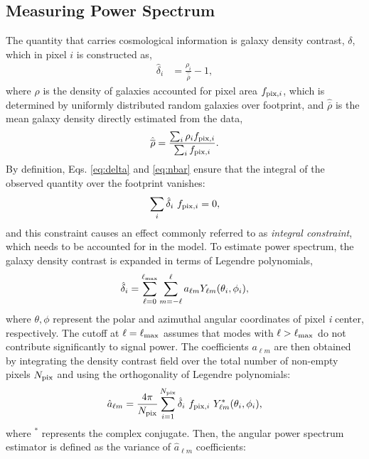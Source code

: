 \subsection{Measuring Power Spectrum}
The quantity that carries cosmological information is galaxy density contrast, $\delta$, which in pixel $i$ is constructed as,
\begin{align}\label{eq:delta}
    \hat{\delta}_{i} &= \frac{\rho_{i}}{\hat{\overline{\rho}}} - 1 ,
\end{align}
where $\rho$ is the density of galaxies accounted for pixel area $f_{{\rm pix},i}$, which is determined by uniformly distributed random galaxies over footprint, and $\hat{\overline{\rho}}$ is the mean galaxy density directly estimated from the data,
\begin{equation}\label{eq:nbar}
\hat{\overline{\rho}} = \frac{\sum_{i}\rho_{i}f_{{\rm pix},i}}{\sum_{i}f_{{\rm pix},i}}.
\end{equation}
By definition, Eqs. \ref{eq:delta} and \ref{eq:nbar} ensure that the integral of the observed quantity over the footprint vanishes:
\begin{align}\label{eq:ic}
    \sum_{i} \hat{\delta}_{i}~f_{{\rm pix},i} = 0,
\end{align}
and this constraint causes an effect commonly referred to as \textit{integral constraint}, which needs to be accounted for in the model. To estimate power spectrum, the galaxy density contrast is expanded in terms of Legendre polynomials,
\begin{equation}
        \hat{\delta}_{i} = \sum_{\ell=0}^{\ell_{{\rm max}}}\sum_{m=-\ell}^{\ell} a_{\ell m} Y_{\ell m}(\theta_{i}, \phi_{i}),
\end{equation}
where $\theta, \phi$ represent the polar and azimuthal angular coordinates of pixel \textit{i} center, respectively. The cutoff at $\ell=\ell_{{\rm max}}$ assumes that modes with $\ell>\ell_{{\rm max}}$ do not contribute significantly to signal power. The  coefficients $a_{\ell m}$ are then obtained by integrating the density contrast field over the total number of non-empty pixels $N_{{\rm pix}}$ and using the orthogonality of Legendre polynomials:
\begin{equation}
        \hat{a}_{\ell m} = \frac{4\pi}{N_{{\rm pix}}} \sum_{i=1}^{N_{{\rm pix}}}  \hat{\delta}_{i}~f_{{\rm pix}, i}~ Y^{*}_{\ell m}(\theta_{i}, \phi_{i}),
\end{equation}
where $^{*}$ represents the complex conjugate. Then, the angular power spectrum estimator is defined as the variance of  $\hat{a}_{\ell m}$  coefficients:
